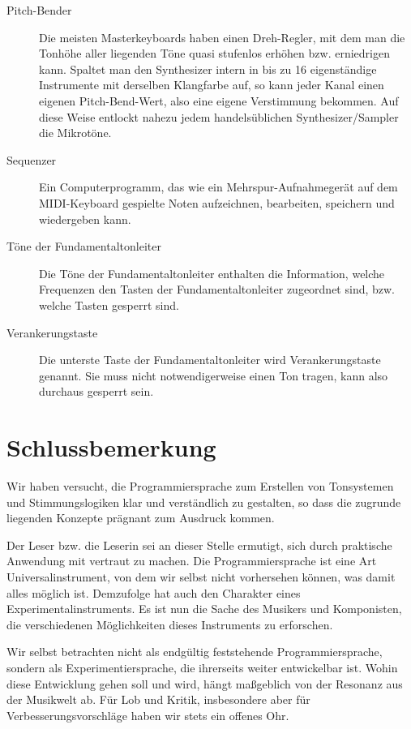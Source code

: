 \begin{description}
\item[{Pitch-Bender}] Die meisten Masterkeyboards haben einen
  Dreh-Regler, mit dem man die Tonhöhe aller liegenden Töne quasi
  stufenlos erhöhen bzw. erniedrigen kann. Spaltet man den Synthesizer
  intern in bis zu 16 eigenständige Instrumente mit derselben
  Klangfarbe auf, so kann jeder Kanal einen eigenen Pitch-Bend-Wert,
  also eine eigene Verstimmung bekommen. Auf diese Weise entlockt
  \mutabor{} nahezu jedem handelsüblichen Synthesizer/Sampler die
  Mikrotöne.

\item[{Sequenzer}] Ein Computerprogramm, das wie ein
  Mehrspur-Aufnahmegerät auf dem MIDI-Key\-board gespielte Noten
  aufzeichnen, bearbeiten, speichern und wiedergeben kann.

\item[{Töne der Fundamentaltonleiter}] Die Töne der
  Fundamentaltonleiter enthalten die Information, welche Frequenzen
  den Tasten der Fundamentaltonleiter zugeordnet sind, bzw. welche Tasten gesperrt sind.

\item[{Verankerungstaste}] Die unterste Taste der Fundamentaltonleiter
  wird Verankerungstaste genannt. Sie muss nicht notwendigerweise einen
  Ton tragen, kann also durchaus gesperrt sein.
\end{description}

\chapter{Schlussbemerkung}\label{cha:schlu3bemerkung}
Wir haben versucht, die Programmiersprache zum Erstellen von
Tonsystemen und Stimmungslogiken klar und verständlich zu
gestalten, so dass die zugrunde liegenden Konzepte prägnant zum
Ausdruck kommen.

Der Leser bzw. die Leserin  sei an dieser Stelle ermutigt, sich
durch praktische Anwendung mit \mutabor{} vertraut zu
machen. Die Programmiersprache \mutabor{} ist eine
Art Universalinstrument, von dem wir selbst nicht vorhersehen
können, was damit alles möglich ist. Demzufolge hat
\mutabor{} auch den Charakter eines
Experimentalinstruments. Es ist nun die Sache des Musikers und
Komponisten, die verschiedenen Möglichkeiten dieses Instruments zu
erforschen.

Wir selbst betrachten \mutabor{} nicht als endgültig
feststehende Programmiersprache, sondern als Experimentiersprache,
die ihrerseits weiter entwickelbar ist. Wohin diese Entwicklung
gehen soll und wird, hängt maßgeblich von der Resonanz aus der
Musikwelt ab. Für Lob und Kritik, insbesondere aber für
Verbesserungsvorschläge haben wir stets ein offenes Ohr.

